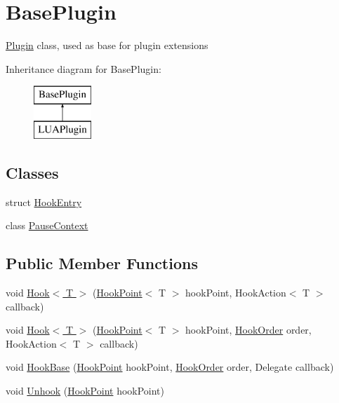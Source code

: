 \hypertarget{classOTA_1_1Plugin_1_1BasePlugin}{}\section{Base\+Plugin}
\label{classOTA_1_1Plugin_1_1BasePlugin}


\hyperlink{namespaceOTA_1_1Plugin}{Plugin} class, used as base for plugin extensions  


Inheritance diagram for Base\+Plugin\+:\begin{figure}[H]
\begin{center}
\leavevmode
\includegraphics[height=2.000000cm]{classOTA_1_1Plugin_1_1BasePlugin}
\end{center}
\end{figure}
\subsection*{Classes}
\begin{DoxyCompactItemize}
\item 
struct \hyperlink{structOTA_1_1Plugin_1_1BasePlugin_1_1HookEntry}{Hook\+Entry}
\item 
class \hyperlink{classOTA_1_1Plugin_1_1BasePlugin_1_1PauseContext}{Pause\+Context}
\end{DoxyCompactItemize}
\subsection*{Public Member Functions}
\begin{DoxyCompactItemize}
\item 
void \hyperlink{classOTA_1_1Plugin_1_1BasePlugin_a3b0a443be6dc5b167737e5803520ac2a}{Hook$<$ T $>$} (\hyperlink{classOTA_1_1Plugin_1_1HookPoint}{Hook\+Point}$<$ T $>$ hook\+Point, Hook\+Action$<$ T $>$ callback)
\item 
void \hyperlink{classOTA_1_1Plugin_1_1BasePlugin_a4602d6d71d715b8e9fce9f9b2dd32747}{Hook$<$ T $>$} (\hyperlink{classOTA_1_1Plugin_1_1HookPoint}{Hook\+Point}$<$ T $>$ hook\+Point, \hyperlink{namespaceOTA_1_1Plugin_a7c65b8c7c155fec0b559afbe2da809c0}{Hook\+Order} order, Hook\+Action$<$ T $>$ callback)
\item 
void \hyperlink{classOTA_1_1Plugin_1_1BasePlugin_a4b27e54ae9b6d403badbf1ae0acd6869}{Hook\+Base} (\hyperlink{classOTA_1_1Plugin_1_1HookPoint}{Hook\+Point} hook\+Point, \hyperlink{namespaceOTA_1_1Plugin_a7c65b8c7c155fec0b559afbe2da809c0}{Hook\+Order} order, Delegate callback)
\item 
void \hyperlink{classOTA_1_1Plugin_1_1BasePlugin_a1cd07dde95d34b0b6766c37a3a900738}{Unhook} (\hyperlink{classOTA_1_1Plugin_1_1HookPoint}{Hook\+Point} hook\+Point)
\end{DoxyCompactItemize}
